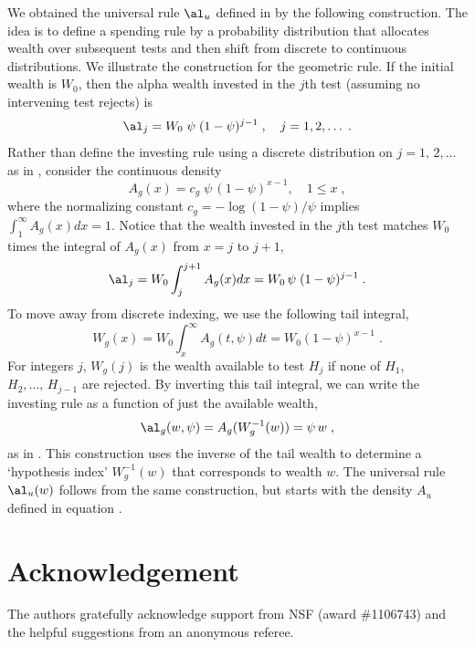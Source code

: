 \documentclass{gSCS2e}
\begin{document}
 We obtained the universal rule $\al_u$ defined in  by
 the following construction.  The idea is to define a spending rule by a
 probability distribution that allocates wealth over subsequent tests and then
 shift from discrete to continuous distributions.  We illustrate the
 construction for the geometric rule.  If the initial wealth is $W_0$, then the
 alpha wealth invested in the $j$th test (assuming no intervening test rejects)
 is
 \begin{equation}
    \al_j = W_0\; \psi \; (1-\psi)^{j-1} \;, \quad j = 1, 2, \ldots\;.   
 \label{eq:alj1}
 \end{equation}
  Rather than define the investing rule using a discrete distribution on
 $j=1,\,2,\ldots$ as in , consider the continuous density
 \begin{equation}
   A_g(x) = c_g \; \psi\,(1-\psi)^{x-1}, \quad 1 \le x\;,
 \label{eq:alg}
 \end{equation}
 where the normalizing constant $c_g = -\log (1-\psi)/\psi$ implies
 $\int_1^{\infty} A_g(x) dx = 1$.  Notice that the wealth invested in the $j$th
 test  matches $W_0$ times the integral of $A_g(x)$ from $x=j$ to
 $j+1$,
 \begin{equation}
    \al_j = W_0 \int_j^{j+1} A_g(x) dx = W_0 \, \psi\; (1-\psi)^{j-1} \;.
 \label{eq:alj2}
 \end{equation}
 To move away from discrete indexing, we use the following tail integral,
 \begin{equation}
    W_g(x) = W_0 \int_x^\infty A_g(t,\psi) dt = W_0 (1-\psi)^{x-1}\;.
 \label{eq:Wg}
 \end{equation}
 For integers $j$, $W_g(j)$ is the wealth available to test $H_j$ if none of
 $H_1$, $H_2, \ldots,\, H_{j-1}$ are rejected.  By inverting this tail integral,
 we can write the investing rule as a function of just the available wealth,
 \begin{equation}
   \al_g(w,\psi) = A_g(W_g^{-1}(w)) = \psi\,w \;,
 \label{eq:Ag}
 \end{equation}
 as in .  This construction uses the inverse of the tail wealth to
 determine a `hypothesis index' $W_g^{-1}(w)$ that corresponds to wealth $w$.
  The universal rule $\al_u(w)$ follows from the same construction, but starts
 with the density $A_u$ defined in equation .
 

\section*{Acknowledgement}

 The authors gratefully acknowledge support from NSF (award \#1106743) and the helpful
 suggestions from an anonymous referee.





\end{document}
